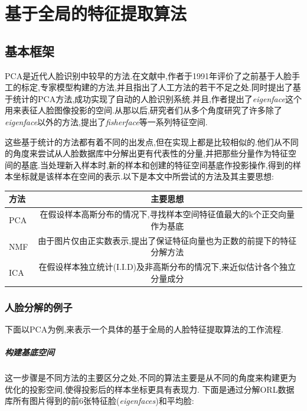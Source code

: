 \chapter{基于全局的特征提取算法}
\label{cha:global}
\section{基本框架}
PCA\cite{turk1991face}是近代人脸识别中较早的方法.在文献中,作者于1991年评价了之前基于人脸手工的标定,专家模型构建的方法,并且指出了人工方法的若干不足之处.同时提出了基于统计的PCA方法,成功实现了自动的人脸识别系统.并且,作者提出了\textit{eigenface}这个用来表征人脸图像投影的空间.从那以后,研究者们从多个角度研究了许多除了\textit{eigenface}以外的方法,提出了\textit{fisherface}\cite{kwak2005face}等一系列特征空间.

这些基于统计的方法都有着不同的出发点,但在实现上都是比较相似的.他们从不同的角度来尝试从人脸数据库中分解出更有代表性的分量,并把那些分量作为特征空间的基底.当处理新入样本时,新的样本和创建的特征空间基底作投影操作,得到的样本坐标就是该样本在空间的表示.以下是本文中所尝试的方法及其主要思想:
\begin{center}
  \footnotesize
  \begin{tabular}{l|c}
  \hline 
    方法 & 主要思想 \\ \hline
    PCA & 在假设样本高斯分布的情况下,寻找样本空间特征值最大的k个正交向量作为基底\\ \hline
    NMF & 由于图片仅由正实数表示,提出了保证特征向量也为正数的前提下的特征分解方法\\ \hline
    ICA & 在假设样本独立统计(I.I.D)及非高斯分布的情况下,来近似估计各个独立分量成分\\
    \hline
  \end{tabular}
\end{center}
\subsection{人脸分解的例子}
下面以PCA为例,来表示一个具体的基于全局的人脸特征提取算法的工作流程.
\paragraph{构建基底空间} 这一步骤是不同方法的主要区分之处,不同的算法主要是从不同的角度来构建更为优化的投影空间,使得投影后的样本坐标更具有表现力.
\newline
下面是通过分解ORL数据库所有图片得到的前6张特征脸(\textit{eigenfaces})和平均脸:

